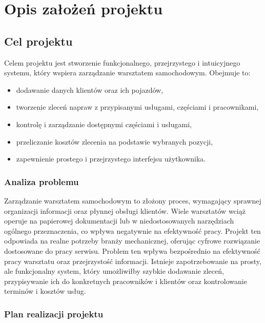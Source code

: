 \chapter{Opis założeń projektu}

\section{Cel projektu}
\label{sec:celProjektu}
Celem projektu jest stworzenie funkcjonalnego, przejrzystego i intuicyjnego systemu, który wspiera zarządzanie warsztatem samochodowym. Obejmuje to:

\begin{itemize}
    \item dodawanie danych klientów oraz ich pojazdów,
    \item tworzenie zleceń napraw z przypisanymi usługami, częściami i pracownikami,
    \item kontrolę i zarządzanie dostępnymi częściami i usługami,
    \item przeliczanie kosztów zlecenia na podstawie wybranych pozycji,
    \item zapewnienie prostego i przejrzystego interfejsu użytkownika.
\end{itemize}

\subsection{Analiza problemu}
\label{sec:analizaProblemu}
Zarządzanie warsztatem samochodowym to złożony proces, wymagający sprawnej organizacji informacji oraz płynnej obsługi klientów. Wiele warsztatów wciąż operuje na papierowej dokumentacji lub w niedostosowanych narzędziach ogólnego przeznaczenia, co wpływa negatywnie na efektywność pracy. Projekt ten odpowiada na realne potrzeby branży mechanicznej, oferując cyfrowe rozwiązanie dostosowane do pracy serwisu.
Problem ten wpływa bezpośrednio na efektywność pracy warsztatu oraz przejrzystość informacji. Istnieje zapotrzebowanie na prosty, ale funkcjonalny system, który umożliwiłby szybkie dodawanie zleceń, przypisywanie ich do konkretnych pracowników i klientów oraz kontrolowanie terminów i kosztów usług.

\subsection{Plan realizacji projektu}
\label{sec:planRealizacji}

